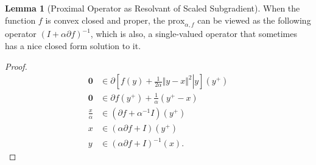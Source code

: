 \documentclass[]{article}
\theoremstyle{definition}
\newtheorem{lemma}{Lemma}[subsection]  %
\begin{document}
        \begin{lemma}[Proximal Operator as Resolvant of Scaled Subgradient]\label{lemma:prox_alternative_form}
            When the function $f$ is convex closed and proper, the $\text{prox}_{\alpha, f}$ can be viewed as the following operator $(I + \alpha \partial f)^{-1}$, which is also, a single-valued operator that sometimes has a nice closed form solution to it.
        \end{lemma}
        \begin{proof}
            \begin{align*}
                \mathbf 0 &\in \partial
                \left[
                    \left.
                        f(y) + \frac{1}{2\alpha} \Vert y - x\Vert^2 
                    \right| y
                \right](y^+)
                \\
                \mathbf 0 &\in \partial f(y^+) + \frac{1}{\alpha}(y^+ - x)
                \\
                \frac{x}{\alpha} &\in 
                (\partial f + \alpha^{-1}I)(y^+)
                \\
                x &\in 
                (\alpha \partial f + I)(y^+)
                \\
                y &\in (\alpha\partial f+ I)^{-1}(x).
            \end{align*}
        \end{proof}
\end{document}
